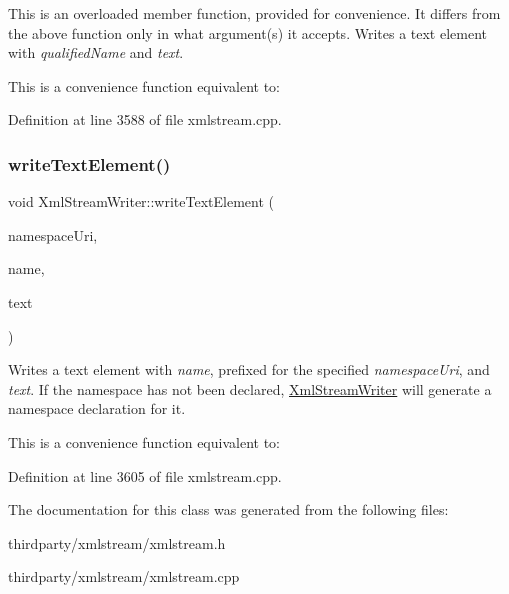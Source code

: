 This is an overloaded member function, provided for convenience. It differs from the above function only in what argument(s) it accepts. Writes a text element with {\itshape qualified\+Name} and {\itshape text}.

This is a convenience function equivalent to\+: 
\begin{DoxyCodeInclude}
\end{DoxyCodeInclude}


Definition at line 3588 of file xmlstream.\+cpp.

\mbox{\label{class_xml_stream_writer_a378c2645f837b9ea5786648285d4d6f4}} 
\subsubsection{\texorpdfstring{write\+Text\+Element()}{writeTextElement()}\hspace{0.1cm}{\footnotesize\ttfamily [2/2]}}
{\footnotesize\ttfamily void Xml\+Stream\+Writer\+::write\+Text\+Element (\begin{DoxyParamCaption}\item[{const Q\+String \&}]{namespace\+Uri,  }\item[{const Q\+String \&}]{name,  }\item[{const Q\+String \&}]{text }\end{DoxyParamCaption})}

Writes a text element with {\itshape name}, prefixed for the specified {\itshape namespace\+Uri}, and {\itshape text}. If the namespace has not been declared, \hyperlink{class_xml_stream_writer}{Xml\+Stream\+Writer} will generate a namespace declaration for it.

This is a convenience function equivalent to\+: 
\begin{DoxyCodeInclude}
\end{DoxyCodeInclude}


Definition at line 3605 of file xmlstream.\+cpp.



The documentation for this class was generated from the following files\+:\begin{DoxyCompactItemize}
\item 
thirdparty/xmlstream/xmlstream.\+h\item 
thirdparty/xmlstream/xmlstream.\+cpp\end{DoxyCompactItemize}
